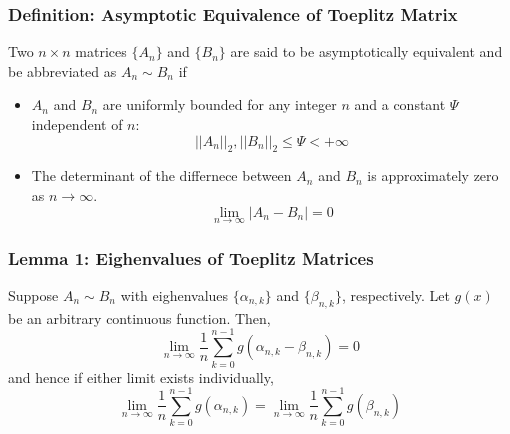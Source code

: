 \documentclass{beamer}
\begin{document}
\begin{frame}
\frametitle{Definition: Asymptotic Equivalence of Toeplitz Matrix}
\begin{block}{}
\cite{Gray:2006} Two $n\times n$ matrices $\{A_n\}$ and $\{B_n\}$ are said to be asymptotically equivalent and be abbreviated as $A_n\sim B_n$ if
  \begin{itemize}
    \item $A_n$ and $B_n$ are uniformly bounded for any integer $n$ and a constant $\Psi$ independent of $n$:
      \begin{equation}
        ||A_n||_2, ||B_n||_2\leq\Psi<+\infty
      \end{equation}
    \item The determinant of the differnece between $A_n$ and $B_n$ is approximately zero as $n\to\infty$.
      \begin{equation}
        \lim_{n\to\infty}|A_n-B_n|=0
      \end{equation}
  \end{itemize}
\end{block}
\end{frame}

\begin{frame}
\frametitle{Lemma 1: Eighenvalues of Toeplitz Matrices}
\begin{block}{}
  \cite[Lemma 1]{Gray:2006} Suppose $A_n\sim B_n$ with eighenvalues $\{\alpha_{n,k}\}$ and $\{\beta_{n,k}\}$, respectively. Let $g(x)$ be an arbitrary continuous function. Then,
  \begin{equation}
    \lim_{n\to\infty}\frac{1}{n}\sum_{k=0}^{n-1}g(\alpha_{n,k}-\beta_{n,k})=0
  \end{equation}
  and hence if either limit exists individually,
  \begin{equation}
    \lim_{n\to\infty}\frac{1}{n}\sum_{k=0}^{n-1}g(\alpha_{n,k})=\lim_{n\to\infty}\frac{1}{n}\sum_{k=0}^{n-1}g(\beta_{n,k})
  \end{equation}
\end{block}
\end{frame}
\end{document}
